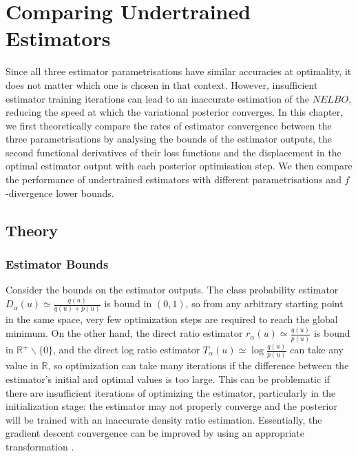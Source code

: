 \documentclass[honours,12pt]{unswthesis}
\newcommand{\R}{\mathbb{R}}
\numberwithin{equation}{section}
\theoremstyle{definition}
\begin{document}
\chapter{Comparing Undertrained Estimators}\label{ch7}
Since all three estimator parametrisations have similar accuracies at optimality, it does not matter which one is chosen in that context. However, insufficient estimator training iterations can lead to an inaccurate estimation of the $NELBO$, reducing the speed at which the variational posterior converges. In this chapter, we first theoretically compare the rates of estimator convergence between the three parametrisations by analysing the bounds of the estimator outputs, the second functional derivatives of their loss functions and the displacement in the optimal estimator output with each posterior optimisation step. We then compare the performance of undertrained estimators with different parametrisations and $f$-divergence lower bounds.
\section{Theory}\label{sec:7.1}
\subsection{Estimator Bounds}
Consider the bounds on the estimator outputs. The class probability estimator $D_\alpha(u)\simeq \frac{q(u)}{q(u)+p(u)}$ is bound in $(0,1)$, so from any arbitrary starting point in the same space, very few optimization steps are required to reach the global minimum. On the other hand, the direct ratio estimator $r_\alpha(u)\simeq \frac{q(u)}{p(u)}$ is bound in $\R^+ \backslash \{0\}$, and the direct log ratio estimator $T_\alpha(u) \simeq \log \frac{q(u)}{p(u)}$ can take any value in $\R$, so optimization can take many iterations if the difference between the estimator's initial and optimal values is too large. This can be problematic if there are insufficient iterations of optimizing the estimator, particularly in the initialization stage: the estimator may not properly converge and the posterior will be trained with an inaccurate density ratio estimation. Essentially, the gradient descent convergence can be improved by using an appropriate transformation \citep{lecun}.
\end{document}
